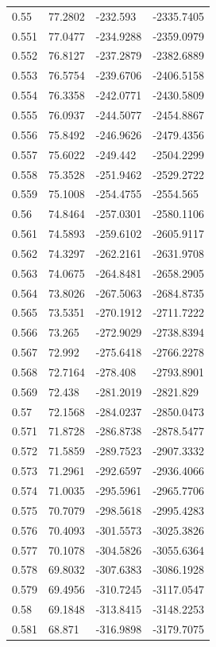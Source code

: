\begin{tabular}{llll}
0.55 & 77.2802 & -232.593 & -2335.7405 \\
0.551 & 77.0477 & -234.9288 & -2359.0979 \\
0.552 & 76.8127 & -237.2879 & -2382.6889 \\
0.553 & 76.5754 & -239.6706 & -2406.5158 \\
0.554 & 76.3358 & -242.0771 & -2430.5809 \\
0.555 & 76.0937 & -244.5077 & -2454.8867 \\
0.556 & 75.8492 & -246.9626 & -2479.4356 \\
0.557 & 75.6022 & -249.442 & -2504.2299 \\
0.558 & 75.3528 & -251.9462 & -2529.2722 \\
0.559 & 75.1008 & -254.4755 & -2554.565 \\
0.56 & 74.8464 & -257.0301 & -2580.1106 \\
0.561 & 74.5893 & -259.6102 & -2605.9117 \\
0.562 & 74.3297 & -262.2161 & -2631.9708 \\
0.563 & 74.0675 & -264.8481 & -2658.2905 \\
0.564 & 73.8026 & -267.5063 & -2684.8735 \\
0.565 & 73.5351 & -270.1912 & -2711.7222 \\
0.566 & 73.265 & -272.9029 & -2738.8394 \\
0.567 & 72.992 & -275.6418 & -2766.2278 \\
0.568 & 72.7164 & -278.408 & -2793.8901 \\
0.569 & 72.438 & -281.2019 & -2821.829 \\
0.57 & 72.1568 & -284.0237 & -2850.0473 \\
0.571 & 71.8728 & -286.8738 & -2878.5477 \\
0.572 & 71.5859 & -289.7523 & -2907.3332 \\
0.573 & 71.2961 & -292.6597 & -2936.4066 \\
0.574 & 71.0035 & -295.5961 & -2965.7706 \\
0.575 & 70.7079 & -298.5618 & -2995.4283 \\
0.576 & 70.4093 & -301.5573 & -3025.3826 \\
0.577 & 70.1078 & -304.5826 & -3055.6364 \\
0.578 & 69.8032 & -307.6383 & -3086.1928 \\
0.579 & 69.4956 & -310.7245 & -3117.0547 \\
0.58 & 69.1848 & -313.8415 & -3148.2253 \\
0.581 & 68.871 & -316.9898 & -3179.7075 \\

\end{tabular}
